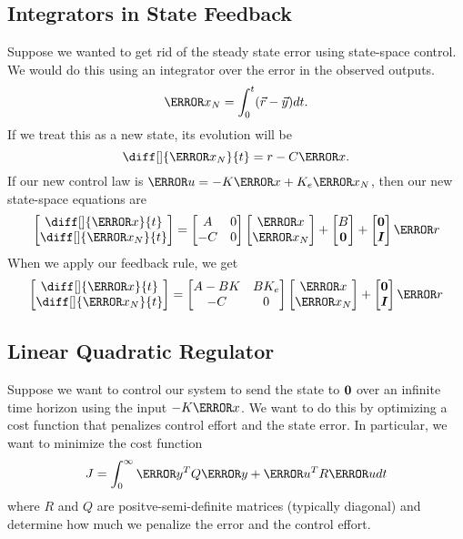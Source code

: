 \subsection{Integrators in State Feedback}
Suppose we wanted to get rid of the steady state error using state-space control. We would do this using an integrator over the error in the observed outputs.
\[
  \V{x}_N = \int_{0}^{t}(\vec{r}-\vec{y})dt.
\]
If we treat this as a new state, its evolution will be
\[
  \diff[]{\V{x}_N}{t} = r - C\V{x}.
\]
If our new control law is $\V{u} = -K\V{x}+K_e\V{x}_N$, then our new state-space equations are
\begin{align*}
  \begin{bmatrix} \diff[]{\V{x}}{t} \\ \diff[]{\V{x}_N}{t} \end{bmatrix}
  = \begin{bmatrix} A & 0 \\ -C & 0 \end{bmatrix} \begin{bmatrix} \V{x} \\ \V{x}_N \end{bmatrix}
  + \begin{bmatrix} B \\ \bs{0} \end{bmatrix} + \begin{bmatrix} \bs{0} \\ \bs{I} \end{bmatrix}\V{r}
\end{align*}
When we apply our feedback rule, we get 
\begin{align*}
  \begin{bmatrix} \diff[]{\V{x}}{t} \\ \diff[]{\V{x}_N}{t} \end{bmatrix}
  = \begin{bmatrix} A-BK & BK_e \\ -C & 0 \end{bmatrix} \begin{bmatrix} \V{x} \\ \V{x}_N \end{bmatrix}
  + \begin{bmatrix} \bs{0} \\ \bs{I} \end{bmatrix}\V{r}
\end{align*}
\subsection{Linear Quadratic Regulator}
Suppose we want to control our system to send the state to $\boldsymbol{0}$ over an infinite time horizon using the input $-K\V{x}$.
We want to do this by optimizing a cost function that penalizes control effort and the state error.
In particular, we want to minimize the cost function
\[
  J = \int_{0}^{\infty}\V{y}^TQ\V{y} + \V{u}^TR\V{u} dt
\]
where $R$ and $Q$ are positve-semi-definite matrices (typically diagonal) and determine how much we penalize the error and the control effort.
